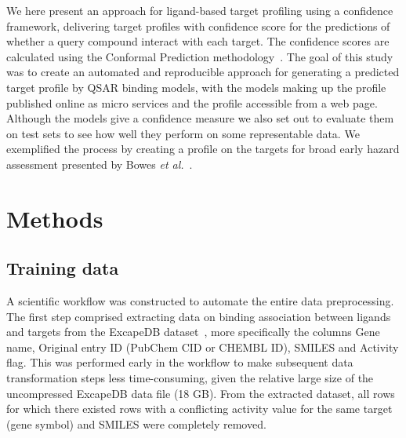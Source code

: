 \documentclass[utf8]{frontiersSCNS} %
\begin{document}
We here present an approach for ligand-based target profiling using a
confidence framework, delivering target profiles with confidence score for the
predictions of whether a query compound interact with each target. The
confidence scores are calculated using the Conformal Prediction
methodology~\cite{Vovk2005}.
%
The goal of this study was to create an automated and reproducible approach for
generating a predicted target profile by QSAR binding models, with the models
making up the profile published online as micro services and the profile
accessible from a web page. Although the models give a confidence measure we
also set out to evaluate them on test sets to see how well they perform on some
representable data. We exemplified the process by creating a profile on the
targets for broad early hazard assessment presented by Bowes \textit{et
al.}~\cite{Bowes2012}.

\section*{Methods}

\subsection{Training data}

A scientific workflow was constructed to automate the entire data
preprocessing.  The first step comprised extracting data on binding association
between ligands and targets from the ExcapeDB dataset~\cite{Sun2017}, more
specifically the columns Gene name, Original entry ID (PubChem CID or CHEMBL
ID), SMILES and Activity flag. This was performed early in the workflow to make
subsequent data transformation steps less time-consuming, given the relative large
size of the uncompressed ExcapeDB data file (18 GB).
%
From the extracted dataset, all rows for which there existed rows with a conflicting
activity value for the same target (gene symbol) and SMILES were completely removed.
\end{document}
